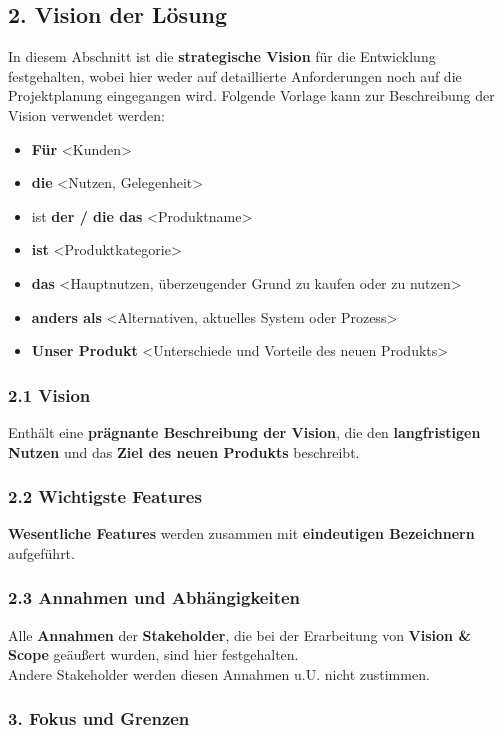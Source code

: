 \subsection*{2. Vision der Lösung}
In diesem Abschnitt ist die \textbf{strategische Vision} für die Entwicklung festgehalten, wobei hier weder auf  detaillierte Anforderungen noch auf die Projektplanung eingegangen wird.
Folgende Vorlage kann zur Beschreibung der Vision verwendet werden:
\begin{itemize}
    \item \textbf{Für} <Kunden>
    \item \textbf{die} <Nutzen, Gelegenheit>
    \item ist \textbf{der / die das} <Produktname>
    \item \textbf{ist} <Produktkategorie>
    \item \textbf{das} <Hauptnutzen, überzeugender Grund zu kaufen oder zu nutzen>
    \item \textbf{anders als} <Alternativen, aktuelles System oder Prozess>
    \item \textbf{Unser Produkt} <Unterschiede und Vorteile des neuen Produkts>
\end{itemize}

\subsubsection*{2.1 Vision}
Enthält eine \textbf{prägnante Beschreibung der Vision}, die den \textbf{langfristigen Nutzen} und das \textbf{Ziel des neuen Produkts} beschreibt.

\subsubsection*{2.2 Wichtigste Features}
\textbf{Wesentliche Features} werden zusammen mit \textbf{eindeutigen Bezeichnern} aufgeführt.

\subsubsection*{2.3 Annahmen und Abhängigkeiten}
Alle \textbf{Annahmen} der \textbf{Stakeholder}, die bei der Erarbeitung von \textbf{Vision \& Scope} geäußert wurden, sind hier festgehalten.\\
Andere Stakeholder werden diesen Annahmen u.U. nicht zustimmen.

\subsubsection*{3. Fokus und Grenzen}

